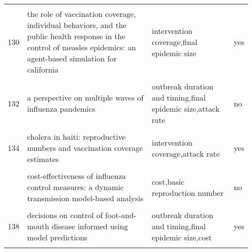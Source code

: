 \documentclass[
]{article}
\begin{document}
\begin{landscape}
\begin{longtable}{l>{\raggedright\arraybackslash}p{4cm}>{\raggedright\arraybackslash}p{6cm}l}
\cellcolor{gray!6}{129} & \cellcolor{gray!6}{simulating optimal vaccination times during cholera outbreaks} & \cellcolor{gray!6}{final epidemic size} & \cellcolor{gray!6}{no}\\
130 & the role of vaccination coverage, individual behaviors, and the public health response in the control of measles epidemics: an agent-based simulation for california & intervention coverage,final epidemic size & yes\\
\addlinespace
\cellcolor{gray!6}{131} & \cellcolor{gray!6}{time is (still) of the essence: quantifying the impact of emergency meningitis vaccination response in katsina state, nigeria} & \cellcolor{gray!6}{cases averted,outbreak duration and timing} & \cellcolor{gray!6}{yes}\\
132 & a perspective on multiple waves of influenza pandemics & outbreak duration and timing,final epidemic size,attack rate & no\\
\cellcolor{gray!6}{133} & \cellcolor{gray!6}{an optimal control problem arising from a dengue disease transmission model} & \cellcolor{gray!6}{final epidemic size} & \cellcolor{gray!6}{yes}\\
134 & cholera in haiti: reproductive numbers and vaccination coverage estimates & intervention coverage,attack rate & yes\\
\cellcolor{gray!6}{135} & \cellcolor{gray!6}{comparing control strategies against foot-and-mouth disease: will vaccination be cost-effective in denmark?} & \cellcolor{gray!6}{outbreak duration and timing,cost,number of infected herds,number of depopulated herds,export losses} & \cellcolor{gray!6}{yes}\\
\addlinespace
136 & cost-effectiveness of influenza control measures: a dynamic transmission model-based analysis & cost,basic reproduction number & no\\
\cellcolor{gray!6}{137} & \cellcolor{gray!6}{cost-effectiveness of workplace closure and travel restriction for mitigating influenza outbreaks: a network-based simulation} & \cellcolor{gray!6}{cost} & \cellcolor{gray!6}{yes}\\
138 & decisions on control of foot-and-mouth disease informed using model predictions & outbreak duration and timing,final epidemic size,cost & yes\\
\cellcolor{gray!6}{139} & \cellcolor{gray!6}{dengue in cape verde: vector control and vaccination} & \cellcolor{gray!6}{campaign duration,final epidemic size,timing of peak} & \cellcolor{gray!6}{no}\\

\end{longtable}
\end{landscape}
\end{document}
